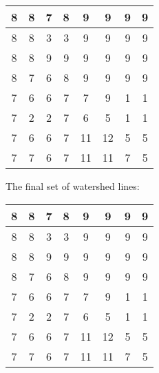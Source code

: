\documentclass[fleqn]{article}
\begin{document}
\begin{description}
    \begin{tabular}{| c | c | c | c | c | c | c | c |}
        \hline
        8 & 8 & \cellcolor{red}7 & 8 & 9 & 9 & 9 & 9 \\ \hline
        8 & 8 & \cellcolor{red} 3 & \cellcolor{red} 3 & 9 & 9 & 9 & 9 \\ \hline
        8 & 8 & 9 & 9 & 9 & 9 & 9 & 9 \\ \hline
        8 & \cellcolor{blue}7 & \cellcolor{blue} 6 & 8 & 9 & 9 & 9 & 9 \\ \hline
        \cellcolor{blue}7 & \cellcolor{blue} 6 & \cellcolor{blue} 6 & \cellcolor{lightgray} 7 & \cellcolor{green} 7 & 9 & \cellcolor{green} 1 & \cellcolor{green} 1 \\ \hline
        \cellcolor{blue}7 & \cellcolor{blue} 2 & \cellcolor{blue} 2 & \cellcolor{lightgray} 7 & \cellcolor{green} 6 & \cellcolor{green} 5 & \cellcolor{green} 1 & \cellcolor{green} 1 \\ \hline
        \cellcolor{blue}7 & \cellcolor{blue} 6 & \cellcolor{blue} 6 & \cellcolor{lightgray} 7 & 11 & 12 & \cellcolor{green} 5 & \cellcolor{green} 5 \\ \hline
        \cellcolor{blue}7 & \cellcolor{blue}7 & \cellcolor{blue} 6 & \cellcolor{blue}7 & 11 & 11 & \cellcolor{green} 7 & \cellcolor{green} 5 \\
        \hline
    \end{tabular}

    The final set of watershed lines:

    \begin{tabular}{| c | c | c | c | c | c | c | c |}
        \hline
        8 & 8 & 7 & 8 & 9 & 9 & 9 & 9 \\ \hline
        8 & 8 & 3 & 3 & 9 & 9 & 9 & 9 \\ \hline
        \cellcolor{lightgray} 8 & \cellcolor{lightgray} 8 & \cellcolor{lightgray} 9 & \cellcolor{lightgray} 9 & 9 & 9 & 9 & 9 \\ \hline
        \cellcolor{lightgray} 8 & 7 & 6 & \cellcolor{lightgray} 8 & \cellcolor{lightgray} 9 & \cellcolor{lightgray} 9 & \cellcolor{lightgray} 9 & \cellcolor{lightgray} 9 \\ \hline
        7 & 6 & 6 & \cellcolor{lightgray} 7 & 7 & 9 & 1 & 1 \\ \hline
        7 & 2 & 2 & \cellcolor{lightgray} 7 & 6 & 5 & 1 & 1 \\ \hline
        7 & 6 & 6 & \cellcolor{lightgray} 7 & \cellcolor{lightgray} 11 & 12 & 5 & 5 \\ \hline
        7 & 7 & 6 & 7 & \cellcolor{lightgray} 11 & 11 & 7 & 5 \\
        \hline
    \end{tabular}

\end{description}
\end{document}
